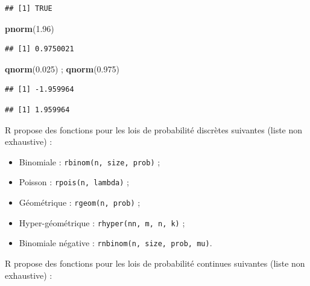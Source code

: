 \documentclass[
  11pt,
]{book}
\newenvironment{Shaded}{\begin{snugshade}}{\end{snugshade}}
\newcommand{\FloatTok}[1]{\textcolor[rgb]{0.00,0.00,0.81}{#1}}
\newcommand{\KeywordTok}[1]{\textcolor[rgb]{0.13,0.29,0.53}{\textbf{#1}}}
\newcommand{\NormalTok}[1]{#1}
\providecommand{\tightlist}{%
  \setlength{\itemsep}{0pt}\setlength{\parskip}{0pt}}
\numberwithin{equation}{section}
\numberwithin{countremarque}{section}
\begin{document}
\begin{lstlisting}
## [1] TRUE
\end{lstlisting}

\begin{Shaded}
\begin{Highlighting}[]
\KeywordTok{pnorm}\NormalTok{(}\FloatTok{1.96}\NormalTok{)}
\end{Highlighting}
\end{Shaded}

\begin{lstlisting}
## [1] 0.9750021
\end{lstlisting}

\begin{Shaded}
\begin{Highlighting}[]
\KeywordTok{qnorm}\NormalTok{(}\FloatTok{0.025}\NormalTok{) ; }\KeywordTok{qnorm}\NormalTok{(}\FloatTok{0.975}\NormalTok{)}
\end{Highlighting}
\end{Shaded}

\begin{lstlisting}
## [1] -1.959964
\end{lstlisting}

\begin{lstlisting}
## [1] 1.959964
\end{lstlisting}

R propose des fonctions pour les lois de probabilité discrètes suivantes (liste non exhaustive) :

\begin{itemize}
\tightlist
\item
  Binomiale : \texttt{rbinom(n,\ size,\ prob)} ;
\item
  Poisson : \texttt{rpois(n,\ lambda)} ;
\item
  Géométrique : \texttt{rgeom(n,\ prob)} ;
\item
  Hyper-géométrique : \texttt{rhyper(nn,\ m,\ n,\ k)} ;
\item
  Binomiale négative : \texttt{rnbinom(n,\ size,\ prob,\ mu)}.
\end{itemize}

R propose des fonctions pour les lois de probabilité continues suivantes (liste non exhaustive) :
\end{document}
